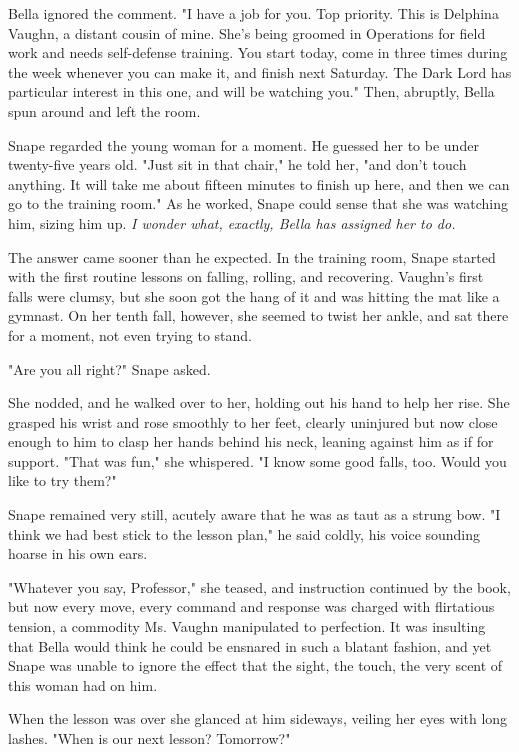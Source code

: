 \documentclass[a4paper,11pt]{article}
\begin{document}
Bella ignored the comment. "I have a job for you. Top priority. This is Delphina Vaughn, a distant cousin of mine. She's being groomed in Operations for field work and needs self-defense training. You start today, come in three times during the week whenever you can make it, and finish next Saturday. The Dark Lord has particular interest in this one, and will be watching you." Then, abruptly, Bella spun around and left the room.

Snape regarded the young woman for a moment. He guessed her to be under twenty-five years old. "Just sit in that chair," he told her, "and don't touch anything. It will take me about fifteen minutes to finish up here, and then we can go to the training room." As he worked, Snape could sense that she was watching him, sizing him up. \emph{I wonder what, exactly, Bella has assigned her to do.}

The answer came sooner than he expected. In the training room, Snape started with the first routine lessons on falling, rolling, and recovering. Vaughn's first falls were clumsy, but she soon got the hang of it and was hitting the mat like a gymnast. On her tenth fall, however, she seemed to twist her ankle, and sat there for a moment, not even trying to stand.

"Are you all right?" Snape asked.

She nodded, and he walked over to her, holding out his hand to help her rise. She grasped his wrist and rose smoothly to her feet, clearly uninjured but now close enough to him to clasp her hands behind his neck, leaning against him as if for support. "That was fun," she whispered. "I know some good falls, too. Would you like to try them?"

Snape remained very still, acutely aware that he was as taut as a strung bow. "I think we had best stick to the lesson plan," he said coldly, his voice sounding hoarse in his own ears.

"Whatever you say, Professor," she teased, and instruction continued by the book, but now every move, every command and response was charged with flirtatious tension, a commodity Ms. Vaughn manipulated to perfection. It was insulting that Bella would think he could be ensnared in such a blatant fashion, and yet Snape was unable to ignore the effect that the sight, the touch, the very scent of this woman had on him.

When the lesson was over she glanced at him sideways, veiling her eyes with long lashes. "When is our next lesson? Tomorrow?"
\end{document}

